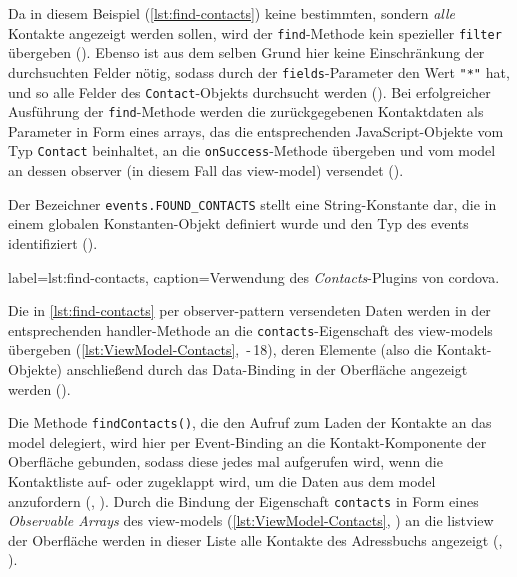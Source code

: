Da in diesem Beispiel (\autoref{lst:find-contacts}) keine bestimmten, sondern \emph{alle} Kontakte angezeigt werden sollen, wird der \lstinline|find|-Methode kein spezieller \lstinline|filter| übergeben (). 
Ebenso ist aus dem selben Grund hier keine Einschränkung der durchsuchten Felder nötig, sodass durch der \lstinline|fields|-Parameter den Wert \lstinline|"*"| hat, und so alle Felder des \lstinline|Contact|-Objekts durchsucht werden ().
Bei erfolgreicher Ausführung der \lstinline|find|-Methode werden die zurückgegebenen Kontaktdaten als Parameter in Form eines \glspl{array}, das die entsprechenden JavaScript-Objekte vom Typ \lstinline|Contact| beinhaltet, an die \lstinline|onSuccess|-Methode übergeben und vom \gls{model} an dessen \gls{observer} (in diesem Fall das \gls{view-model}) versendet (). 

Der Bezeichner \lstinline|events.FOUND_CONTACTS| stellt eine String-Konstante dar, die in einem globalen Konstanten-Objekt definiert wurde und den Typ des \glspl{event} identifiziert ().

	 { label=lst:find-contacts, caption={Verwendung des \emph{Contacts}-Plugins von \gls{cordova}.}}

Die in \autoref{lst:find-contacts} per \gls{observer-pattern} versendeten Daten werden in der entsprechenden \gls{handler}-Methode an die \lstinline|contacts|-Eigenschaft des \glspl{view-model} übergeben (\autoref{lst:ViewModel-Contacts}, \,-\,18), deren Elemente (also die Kontakt-Objekte) anschließend durch das Data-Binding in der Oberfläche angezeigt werden (\su).


Die Methode \lstinline|findContacts()|, die den Aufruf zum Laden der Kontakte an das \gls{model} delegiert, wird hier per Event-Binding an die Kontakt-Komponente der Oberfläche gebunden, sodass diese jedes mal aufgerufen wird, wenn die Kontaktliste auf- oder zugeklappt wird, um die Daten aus dem \gls{model} anzufordern (, ).
Durch die Bindung der Eigenschaft \lstinline|contacts| in Form eines \emph{Observable Arrays} des \glspl{view-model} (\autoref{lst:ViewModel-Contacts}, ) an die \gls{listview} der Oberfläche werden in dieser Liste alle Kontakte des Adressbuchs angezeigt (, ).

